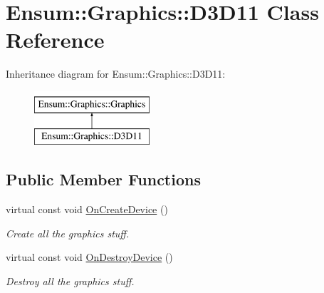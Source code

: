 \hypertarget{class_ensum_1_1_graphics_1_1_d3_d11}{}\section{Ensum\+:\+:Graphics\+:\+:D3\+D11 Class Reference}
\label{class_ensum_1_1_graphics_1_1_d3_d11}
Inheritance diagram for Ensum\+:\+:Graphics\+:\+:D3\+D11\+:\begin{figure}[H]
\begin{center}
\leavevmode
\includegraphics[height=2.000000cm]{class_ensum_1_1_graphics_1_1_d3_d11}
\end{center}
\end{figure}
\subsection*{Public Member Functions}
\begin{DoxyCompactItemize}
\item 
virtual const void \hyperlink{class_ensum_1_1_graphics_1_1_d3_d11_acd6cd3569d5c0dfc50398b3828578990}{On\+Create\+Device} ()\hypertarget{class_ensum_1_1_graphics_1_1_d3_d11_acd6cd3569d5c0dfc50398b3828578990}{}\label{class_ensum_1_1_graphics_1_1_d3_d11_acd6cd3569d5c0dfc50398b3828578990}

\begin{DoxyCompactList}\small\item\em Create all the graphics stuff. \end{DoxyCompactList}\item 
virtual const void \hyperlink{class_ensum_1_1_graphics_1_1_d3_d11_a302b7c773ae06b4344324d4a94ea7aa1}{On\+Destroy\+Device} ()\hypertarget{class_ensum_1_1_graphics_1_1_d3_d11_a302b7c773ae06b4344324d4a94ea7aa1}{}\label{class_ensum_1_1_graphics_1_1_d3_d11_a302b7c773ae06b4344324d4a94ea7aa1}

\begin{DoxyCompactList}\small\item\em Destroy all the graphics stuff. \end{DoxyCompactList}\end{DoxyCompactItemize}
